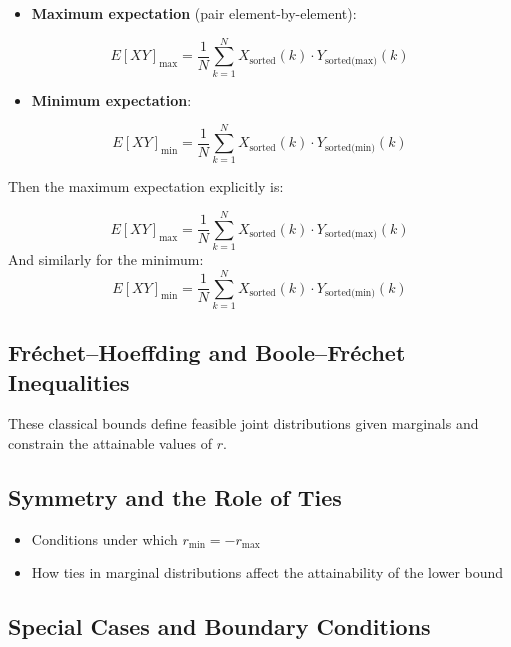 \documentclass[
  12pt,
]{article}
\providecommand{\tightlist}{%
  \setlength{\itemsep}{0pt}\setlength{\parskip}{0pt}}\usepackage{longtable,booktabs,array}
\begin{document}
\begin{itemize}
\tightlist
\item
  \textbf{Maximum expectation} (pair element-by-element):
\end{itemize}

\[E[XY]_{\text{max}} = \frac{1}{N}\sum_{k=1}^{N} X_{\text{sorted}}(k)\cdot Y_{\text{sorted(max)}}(k)\]

\begin{itemize}
\tightlist
\item
  \textbf{Minimum expectation}:
\end{itemize}

\[E[XY]_{\text{min}} = \frac{1}{N}\sum_{k=1}^{N} X_{\text{sorted}}(k)\cdot Y_{\text{sorted(min)}}(k)\]

Then the maximum expectation explicitly is:

\[E[XY]_{\text{max}}=\frac{1}{N}\sum_{k=1}^{N}X_{\text{sorted}}(k)\cdot Y_{\text{sorted(max)}}(k)\]
And similarly for the minimum:
\[E[XY]_{\text{min}}=\frac{1}{N}\sum_{k=1}^{N}X_{\text{sorted}}(k)\cdot Y_{\text{sorted(min)}}(k)\]

\subsection{Fréchet--Hoeffding and Boole--Fréchet
Inequalities}\label{fruxe9chethoeffding-and-boolefruxe9chet-inequalities}

These classical bounds define feasible joint distributions given
marginals and constrain the attainable values of \(r\).

\subsection{Symmetry and the Role of
Ties}\label{symmetry-and-the-role-of-ties}

\begin{itemize}
\tightlist
\item
  Conditions under which \(r_{\min} = -r_{\max}\)
\item
  How ties in marginal distributions affect the attainability of the
  lower bound
\end{itemize}

\subsection{Special Cases and Boundary
Conditions}\label{special-cases-and-boundary-conditions}
\end{document}
